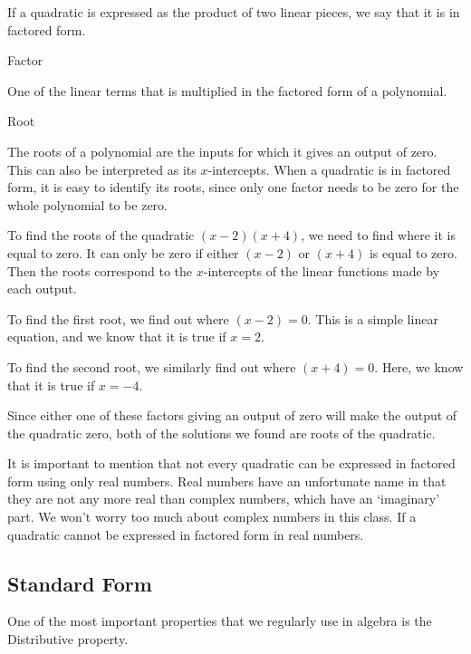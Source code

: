 If a quadratic is expressed as the product of two linear pieces, we say that it is in factored form.

\begin{defn} Factor

One of the linear terms that is multiplied in the factored form of a polynomial.
\end{defn}

\begin{defn} Root

The roots of a polynomial are the inputs for which it gives an output of zero.  This can also be interpreted as its $x$-intercepts.  When a quadratic is in factored form, it is easy to identify its roots, since only one factor needs to be zero for the whole polynomial to be zero.
\end{defn}

\begin{example}

To find the roots of the quadratic $(x-2)(x+4)$, we need to find where it is equal to zero.  It can only be zero if either $(x-2)$ or $(x+4)$ is equal to zero.  Then the roots correspond to the $x$-intercepts of the linear functions made by each output.

To find the first root, we find out where $(x-2) = 0$.  This is a simple linear equation, and we know that it is true if $x = 2$.

To find the second root, we similarly find out where $(x+4) = 0$.  Here, we know that it is true if $x = -4$.

Since either one of these factors giving an output of zero will make the output of the quadratic zero, both of the solutions we found are roots of the quadratic.

\end{example}


It is important to mention that not every quadratic can be expressed in factored form using only real numbers.  Real numbers have an unfortunate name in that they are not any more real than complex numbers, which have an `imaginary' part.  We won't worry too much about complex numbers in this class.  If a quadratic cannot be expressed in factored form in real numbers.

\subsection*{Standard Form}


One of the most important properties that we regularly use in algebra is the Distributive property.

